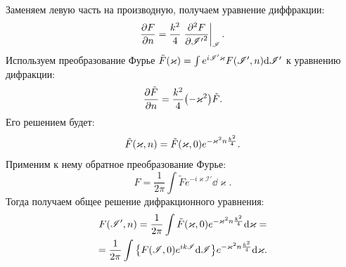 \documentclass[a4paper,9pt,russian]{article}
\newcommand{\I}{\mathscr{I}}
\renewcommand{\-}{\bar}
\newcommand{\K}{\varkappa}
\begin{document}
Заменяем левую часть на производную, получаем уравнение диффракции:
\begin{equation}\label{dif_eq}
	\pdv{F}{n}=\frac{k^2}{4}\eval{\pdv[2]{F}{\I{'}}}_\I.
\end{equation}
Используем преобразование Фурье $\tilde F\qty(\varkappa) = \int e^{i \I{'} \K} F\qty(\I{'}, n) \dd \I{'}$ к уравнению дифракции:
\[
\pdv{\tilde F}{n} = \dfrac{k^2}{4}\qty(-\K^2)\tilde F
.\]
Его решением будет: 
\[
	\tilde F\qty(\K, n) = \tilde F\qty(\K, 0) e^{-\K^2 n \frac{k^2}{4}}
.\]
Применим к нему обратное преобразование Фурье: $$F =\frac{1}{2\pi} \int \tilde F e^{-i\K\I{'}}\dd \K.$$
Тогда получаем общее решение дифракционного уравнения:
\begin{multline}
	F\qty(\I{'}, n) =\dfrac{1}{2\pi}\int \tilde F\qty(\K, 0) e^{-\K^2 n \frac{k^2}{4}}\dd\K =\\ = \dfrac{1}{2\pi}\int\qty{F\qty(\I, 0) e^{ik\I}\dd \I} e^{-\K^2 n \frac{k^2}{4}}\dd\K.
\end{multline}
\end{document}
